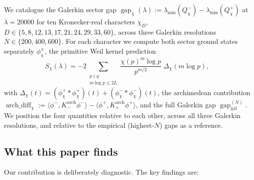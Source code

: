 \documentclass[10pt,twocolumn]{article}
\theoremstyle{definition}
\theoremstyle{remark}
\newcommand{\gap}{\operatorname{gap}}
\newcommand{\chifn}{\chi}
\newcommand{\Deltachi}{\Delta_{\chifn}}
\newcommand{\archdiff}{\operatorname{arch\_diff}}
\begin{document}
We catalogue the Galerkin sector gap
$\gap_{\chifn}(\lambda)
  :=\lambda_{\min}(Q^-_{\chifn})-\lambda_{\min}(Q^+_{\chifn})$
at $\lambda=20000$ for ten Kronecker-real characters
$\chi_D$, $D\in\{5,8,12,13,17,21,24,29,33,60\}$,
across three Galerkin resolutions $N\in\{200,400,600\}$. For each
character we compute both sector ground states separately
$\phi^\pm_{\chifn}$, the primitive Weil kernel prediction
\begin{equation}
\label{eq:predictor}
  S_{\chifn}(\lambda)
    = -2\sum_{\substack{p\nmid q\\m\log p\leq 2L}}
      \frac{\chifn(p)^m\log p}{p^{m/2}}\;\Deltachi(m\log p),
\end{equation}
with
$\Deltachi(t)
  =(\phi^+_{\chifn}\!*\phi^+_{\chifn})(t)
    +(\phi^-_{\chifn}\!*\phi^-_{\chifn})(t)$,
the archimedean contribution
$\archdiff_{\chifn}
  :=\langle\phi^-,K^{\mathrm{arch}}_-\phi^-\rangle
    -\langle\phi^+,K^{\mathrm{arch}}_+\phi^+\rangle$,
and the full Galerkin gap $\gap_{\mathrm{gal}}^{(N)}$. We position the
four quantities relative to each other, across all three Galerkin
resolutions, and relative to the empirical (highest-$N$) gaps as a
reference.

\subsection{What this paper finds}
\label{sec:intro-findings}

Our contribution is deliberately diagnostic. The key findings are:
\end{document}
